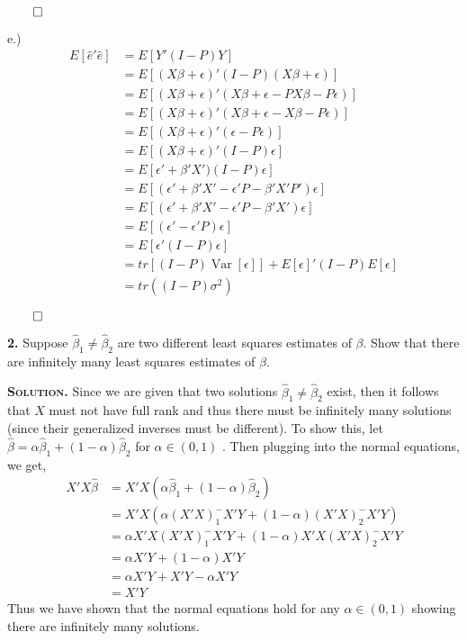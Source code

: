 \documentclass{article}
\newcommand{\Var}{\operatorname{Var}} %
\begin{document}
 \begin{flushright}
\(\qed\)
\end{flushright} 

\newpage
e.) 
\begin{align*}
E[\hat e '\hat e] &= E[Y'(I-P) Y] \\
&= E[ (X\beta+\epsilon)'(I-P) (X\beta + \epsilon ) ] \\
&= E[ (X\beta+\epsilon)' (X\beta + \epsilon - PX\beta - P\epsilon ) ] \\ 
&= E[ (X\beta+\epsilon)' ( X\beta + \epsilon - X\beta - P\epsilon ) ]\\
&= E[ (X\beta+\epsilon)' (  \epsilon  - P\epsilon ) ] \\
&=  E[ (X\beta+\epsilon)' (I-P) \epsilon ] \\
&= E[\epsilon' + \beta' X')(I-P) \epsilon] \\
&= E[ (\epsilon' + \beta' X' - \epsilon'P- \beta'X'P' ) \epsilon ] \\
&=  E[ (\epsilon' + \beta' X' - \epsilon'P- \beta'X') \epsilon ] \\
&=  E[ (\epsilon' - \epsilon'P) \epsilon ]  \\
&= E[ \epsilon'(I-P) \epsilon ]  \\
&= tr[ (I-P)\Var[\epsilon] ]+ E[\epsilon]'(I-P)E[\epsilon]  \\
&= tr((I-P)\sigma^2) 
\end{align*}
 \begin{flushright}
\(\qed\)
\end{flushright} 


\textbf{2. } Suppose \( \hat \beta_1 \neq \hat \beta_2\) are two different least squares estimates of \(\beta\). Show that there are infinitely many least squares estimates of \(\beta\). 

\vspace{4mm} 
\textbf{\textsc{Solution.} }Since we are given that two solutions \( \hat \beta_1 \neq \hat \beta_2\) exist, then it follows that \(X\) must not have full rank and thus there must be infinitely many solutions (since their generalized inverses must be different). To show this, let \(\hat \beta = \alpha \hat\beta_1 + (1-\alpha)\hat\beta_2\) for \(\alpha \in (0,1)\) . Then plugging into the normal equations, we get, 
\begin{align*}
X'X\hat\beta &= X'X(\alpha \hat\beta_1 + (1-\alpha)\hat\beta_2) \\
&= X'X(\alpha (X'X)_1^-X'Y + (1-\alpha)(X'X)_2^-X'Y ) \\
&= \alpha X'X(X'X)_1^- X'Y + (1-\alpha)X'X(X'X)_2^- X'Y \\
&= \alpha X'Y +(1-\alpha)X'Y\\
&=  \alpha X'Y + X'Y -\alpha X'Y\\
&=X'Y
\end{align*}
Thus we have shown that the normal equations hold for any \(\alpha \in (0,1)\) showing there are infinitely many solutions. 
\end{document}
